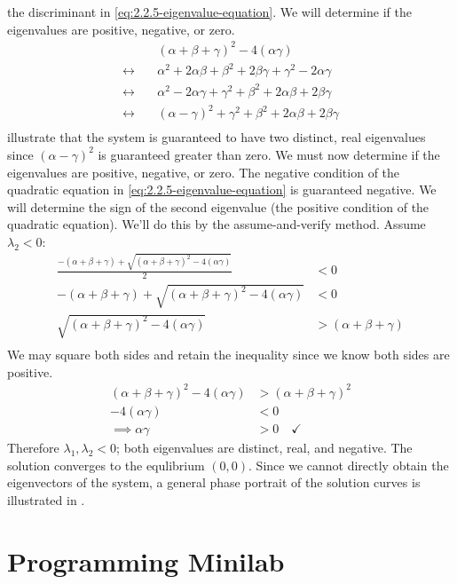 \documentclass[12pt]{article}
\begin{document}
the discriminant in \cref{eq:2.2.5-eigenvalue-equation}. We will determine if
the eigenvalues are positive, negative, or zero.
\begin{equation}
  \label{eq:2.2.5-positive-illustration}
  \begin{aligned}
    & {(\alpha+\beta+\gamma)}^2-4(\alpha\gamma) \\
    \longleftrightarrow\quad& \alpha^2 + 2\alpha\beta + \beta^2 + 2\beta\gamma +
    \gamma^2 - 2\alpha\gamma \\
    \longleftrightarrow\quad& \alpha^2 - 2\alpha\gamma + \gamma^2 + \beta^2 +
    2\alpha\beta + 2\beta\gamma \\
    \longleftrightarrow\quad& {(\alpha-\gamma)}^2 + \gamma^2 + \beta^2 + 2\alpha\beta +
    2\beta\gamma \\
  \end{aligned}
\end{equation}
 illustrate
that the system is guaranteed to have two distinct, real eigenvalues since
${(\alpha-\gamma)}^2$ is guaranteed greater than zero. We must now determine if
the eigenvalues are positive, negative, or zero. The negative condition of the
quadratic equation in \cref{eq:2.2.5-eigenvalue-equation} is guaranteed
negative. We will determine the sign of the second eigenvalue (the positive
condition of the quadratic equation). We'll do this by the assume-and-verify
method. Assume $\lambda_2<0$:
\begin{equation*}
  \begin{aligned}
    \frac{-(\alpha+\beta+\gamma)+\sqrt{{(\alpha+\beta+\gamma)}^2-4(\alpha\gamma)}}{2} &<0 \\
    -(\alpha+\beta+\gamma)+\sqrt{{(\alpha+\beta+\gamma)}^2-4(\alpha\gamma)} &<0 \\
     \sqrt{{(\alpha+\beta+\gamma)}^2-4(\alpha\gamma)} &> (\alpha+\beta+\gamma) \\
  \end{aligned}
\end{equation*}
We may square both sides and retain the inequality since we know both sides are
positive.
\begin{equation}
  \begin{aligned}
    {(\alpha+\beta+\gamma)}^2-4(\alpha\gamma) &> {(\alpha+\beta+\gamma)}^2 \\
    -4(\alpha\gamma) &< 0 \\
    \implies \alpha\gamma &> 0 \quad\checkmark
  \end{aligned}
\end{equation}
Therefore $\lambda_1,\lambda_2<0$; both eigenvalues are distinct, real, and
negative. The solution converges to the equlibrium $(0,0)$. Since we cannot
directly obtain the eigenvectors of the system, a general phase portrait of the
solution curves is illustrated in \todo[figure].
\newpage
\section{Programming Minilab}
\todo[]
\end{document}
